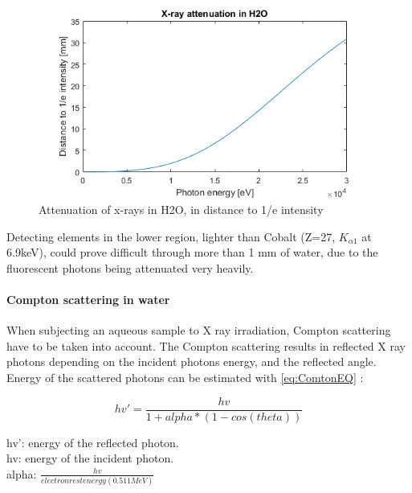 \begin{figure}[h]
	\centering
	\includegraphics[width=\textwidth]{figures/XRF/XrayAttnH2O.png}
	\caption{Attenuation of x-rays in H2O, in distance to 1/e intensity\citep{XRay_Attn_H2O}}
	\label{fig:AttnH2O}
\end{figure}


Detecting elements in the lower region, lighter than Cobalt (Z=27, $K_{\alpha 1}$ at 6.9keV), could prove difficult through more than 1 mm of water, due to the fluorescent photons being attenuated very heavily. 


\paragraph{Compton scattering in water}
When subjecting an aqueous sample to X ray irradiation, Compton scattering have to be taken into account. The Compton scattering results in reflected X ray photons depending on the incident photons energy, and the reflected angle. Energy of the scattered photons can be estimated with \ref{eq:ComtonEQ} \citep{ComptonScatt}:

\begin{equation}
\label{eq:ComtonEQ}
hv' =  \frac{hv}{ 1+alpha*(1-cos(theta)) }
\end{equation}

\noindent hv': energy of the reflected photon.\\
hv: energy of the incident photon.\\
alpha: $\frac{hv}{electron rest energy (0.511MeV)}$ \\
 





